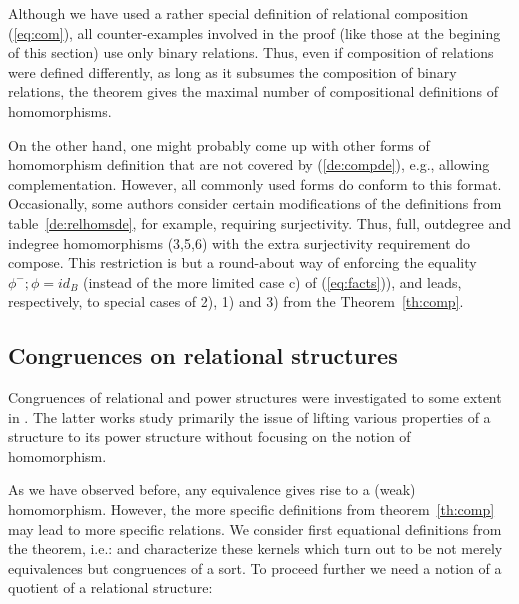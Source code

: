 \documentclass[10pt]{article}
\begin{document}
\noindent
Although we have used a rather special definition of
relational composition (\ref{eq:com}), all counter-examples involved in 
the proof (like those at the begining of this section)
use only binary relations. Thus, even if composition of relations were defined
differently, as long as it subsumes the composition of binary
relations, the theorem gives the maximal number of compositional
definitions of homomorphisms.

On the other hand, one might probably come up with other forms of
homomorphism definition  that are not covered by (\ref{de:compde}), e.g., allowing
complementation. However, all
commonly used forms do
conform to this format. Occasionally, some authors consider certain
modifications of the definitions from table~\ref{de:relhomsde},
for example, requiring surjectivity. Thus, full, outdegree
and indegree homomorphisms (3,5,6) with the extra surjectivity
requirement do compose.  This restriction is but a round-about way of
enforcing the equality $\phi^-;\phi=id_B$ (instead of the more limited
case c) of (\ref{eq:facts})), and leads, respectively, to special cases of 2),
1) and 3) from the Theorem~\ref{th:comp}.



\subsection{Congruences on relational structures}
\label{sub:congrel}

Congruences of relational and power structures %
were investigated to some extent
in \cite{relhoms, brink93, brink97}. The latter works study primarily the issue
of lifting various properties of a structure to its power structure
without focusing on the notion of homomorphism.

As we have observed
before, any equivalence gives rise to a (weak) homomorphism.
However, the more specific definitions from theorem~\ref{th:comp} may
lead to more specific relations. We consider first equational
definitions from the theorem, i.e.: 
and characterize these kernels which turn out to be not merely
equivalences but congruences of a sort. To proceed further we need a
notion of a quotient of a relational structure:
\end{document}
